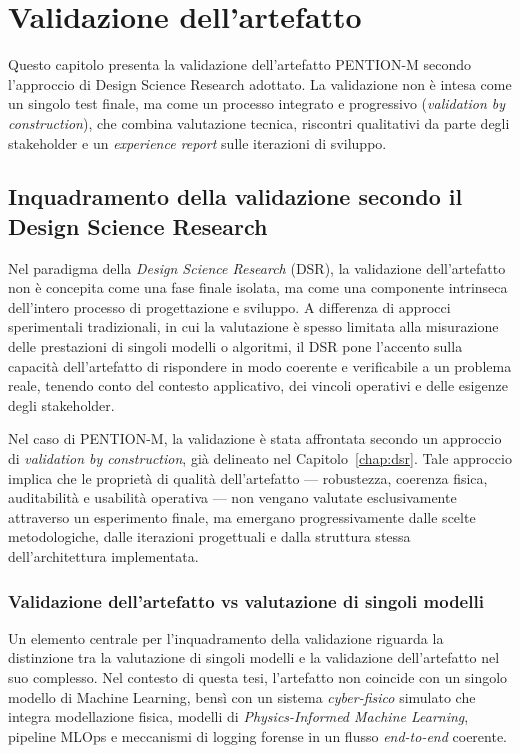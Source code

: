 
\chapter{Validazione dell’artefatto}
\label{chap:evaluation}

Questo capitolo presenta la validazione dell’artefatto PENTION-M secondo l’approccio di Design Science Research adottato.
La validazione non è intesa come un singolo test finale, ma come un processo integrato e progressivo (\emph{validation by construction}), che combina valutazione tecnica, riscontri qualitativi da parte degli stakeholder e un \emph{experience report} sulle iterazioni di sviluppo.

\section{Inquadramento della validazione secondo il Design Science Research}
\label{sec:validation_dsr}

Nel paradigma della \emph{Design Science Research} (DSR), la validazione dell’artefatto non è concepita come una fase finale isolata, ma come una componente intrinseca dell’intero processo di progettazione e sviluppo.
A differenza di approcci sperimentali tradizionali, in cui la valutazione è spesso limitata alla misurazione delle prestazioni di singoli modelli o algoritmi, il DSR pone l’accento sulla capacità dell’artefatto di rispondere in modo coerente e verificabile a un problema reale, tenendo conto del contesto applicativo, dei vincoli operativi e delle esigenze degli stakeholder.

Nel caso di \textsc{PENTION-M}, la validazione è stata affrontata secondo un approccio di \emph{validation by construction}, già delineato nel Capitolo~\ref{chap:dsr}.
Tale approccio implica che le proprietà di qualità dell’artefatto — robustezza, coerenza fisica, auditabilità e usabilità operativa — non vengano valutate esclusivamente attraverso un esperimento finale, ma emergano progressivamente dalle scelte metodologiche, dalle iterazioni progettuali e dalla struttura stessa dell’architettura implementata.

\subsection*{Validazione dell’artefatto vs valutazione di singoli modelli}

Un elemento centrale per l’inquadramento della validazione riguarda la distinzione tra la valutazione di singoli modelli e la validazione dell’artefatto nel suo complesso.
Nel contesto di questa tesi, l’artefatto non coincide con un singolo modello di Machine Learning, bensì con un sistema \textit{cyber-fisico} simulato che integra modellazione fisica, modelli di \emph{Physics-Informed Machine Learning}, pipeline MLOps e meccanismi di logging forense in un flusso \textit{end-to-end} coerente.

